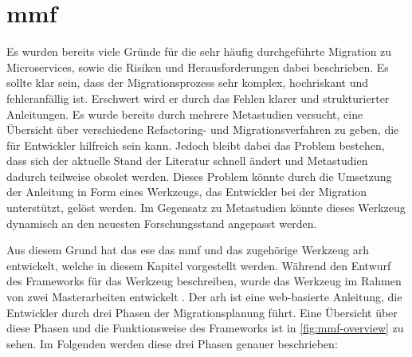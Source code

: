\section{\acrfull{mmf}}
\label{sec:mmf}

Es wurden bereits viele Gründe für die sehr häufig durchgeführte Migration zu Microservices, sowie die Risiken und Herausforderungen dabei beschrieben.
Es sollte klar sein, dass der Migrationsprozess sehr komplex, hochriskant und fehleranfällig ist.
Erschwert wird er durch das Fehlen klarer und strukturierter Anleitungen.
Es wurde bereits durch mehrere Metastudien versucht, eine Übersicht über verschiedene Refactoring- und Migrationsverfahren zu geben, die für Entwickler hilfreich sein kann.
Jedoch bleibt dabei das Problem bestehen, dass sich der aktuelle Stand der Literatur schnell ändert und Metastudien dadurch teilweise obsolet werden.
Dieses Problem könnte durch die Umsetzung der Anleitung in Form eines Werkzeugs, das Entwickler bei der Migration unterstützt, gelöst werden.
Im Gegensatz zu Metastudien könnte dieses Werkzeug dynamisch an den neuesten Forschungsstand angepasst werden.

Aus diesem Grund hat das \gls{ese} das \acrfull{mmf} und das zugehörige Werkzeug \gls{arh} \cite{arh-github} entwickelt, welche in diesem Kapitel vorgestellt werden.
Während  den Entwurf des Frameworks für das Werkzeug beschreiben, wurde das Werkzeug im Rahmen von zwei Masterarbeiten entwickelt \cite{master-daniel-koch,master-tobias-haller}.
Der \gls{arh} ist eine web-basierte Anleitung, die Entwickler durch drei Phasen der Migrationsplanung führt.
Eine Übersicht über diese Phasen und die Funktionsweise des Frameworks ist in \cref{fig:mmf-overview} zu sehen.
Im Folgenden werden diese drei Phasen genauer beschrieben:

